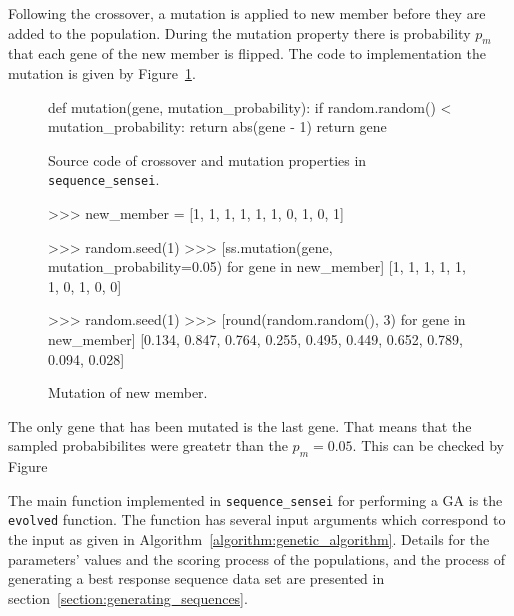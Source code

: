 Following the crossover, a mutation is applied to new member before they are
added to the population. During the mutation property there is probability
\(p_m\) that each gene of the new member is flipped. The code to implementation
the mutation is given by Figure~\ref{fig:mutation_implementation}.

\begin{figure}[!htbp]
    \begin{sourcepy}
def mutation(gene, mutation_probability): if random.random() <
    mutation_probability: return abs(gene - 1) return gene
\end{sourcepy}
\caption{Source code of crossover and mutation properties in \texttt{sequence_sensei}.}\label{fig:mutation_implementation}
\end{figure}


\begin{figure}[!htbp]
    \begin{usagepy}
>>> new_member = [1, 1, 1, 1, 1, 1, 0, 1, 0, 1]

>>> random.seed(1)
>>> [ss.mutation(gene, mutation_probability=0.05) for gene in new_member]
[1, 1, 1, 1, 1, 1, 0, 1, 0, 0]

>>> random.seed(1)
>>> [round(random.random(), 3) for gene in new_member]
[0.134, 0.847, 0.764, 0.255, 0.495, 0.449, 0.652, 0.789, 0.094, 0.028]
\end{usagepy}
\caption{Mutation of new member.}\label{fig:crossover_usage}
\end{figure}

The only gene that has been mutated is the last gene. That means that the
sampled probabibilites were greatetr than the \(p_m = 0.05\). This can be checked
by Figure

\begin{figure}[!htbp]
    \centering
    
\end{figure}

The main function implemented in \texttt{sequence_sensei} for
performing a GA is the \texttt{evolved} function. The function has
several input arguments which correspond to the input as given in
Algorithm~\ref{algorithm:genetic_algorithm}. Details for the parameters' values
and the scoring process of the populations, and the process of generating a best
response sequence data set are presented in
section~\ref{section:generating_sequences}.

